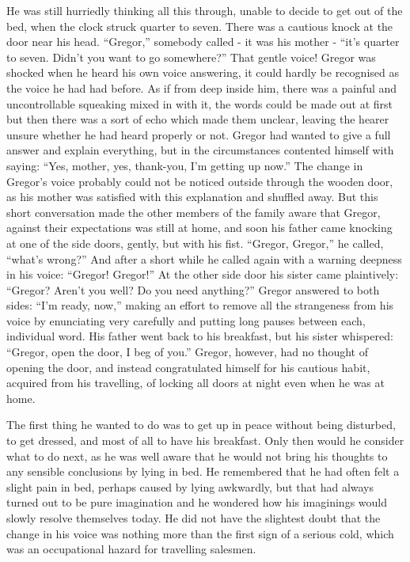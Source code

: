 \documentclass[12pt]{report}
\begin{document}
He was still hurriedly thinking all this through, unable to decide to
get out of the bed, when the clock struck quarter to seven. There was a
cautious knock at the door near his head. ``Gregor,'' somebody called -
it was his mother - ``it's quarter to seven. Didn't you want to go
somewhere?'' That gentle voice! Gregor was shocked when he heard his own
voice answering, it could hardly be recognised as the voice he had had
before. As if from deep inside him, there was a painful and
uncontrollable squeaking mixed in with it, the words could be made out
at first but then there was a sort of echo which made them unclear,
leaving the hearer unsure whether he had heard properly or not. Gregor
had wanted to give a full answer and explain everything, but in the
circumstances contented himself with saying: ``Yes, mother, yes,
thank-you, I'm getting up now.'' The change in Gregor's voice probably
could not be noticed outside through the wooden door, as his mother was
satisfied with this explanation and shuffled away. But this short
conversation made the other members of the family aware that Gregor,
against their expectations was still at home, and soon his father came
knocking at one of the side doors, gently, but with his fist. ``Gregor,
Gregor,'' he called, ``what's wrong?'' And after a short while he called
again with a warning deepness in his voice: ``Gregor! Gregor!'' At the
other side door his sister came plaintively: ``Gregor? Aren't you well?
Do you need anything?'' Gregor answered to both sides: ``I'm ready,
now,'' making an effort to remove all the strangeness from his voice by
enunciating very carefully and putting long pauses between each,
individual word. His father went back to his breakfast, but his sister
whispered: ``Gregor, open the door, I beg of you.'' Gregor, however, had
no thought of opening the door, and instead congratulated himself for
his cautious habit, acquired from his travelling, of locking all doors
at night even when he was at home.

The first thing he wanted to do was to get up in peace without being
disturbed, to get dressed, and most of all to have his breakfast. Only
then would he consider what to do next, as he was well aware that he
would not bring his thoughts to any sensible conclusions by lying in
bed. He remembered that he had often felt a slight pain in bed, perhaps
caused by lying awkwardly, but that had always turned out to be pure
imagination and he wondered how his imaginings would slowly resolve
themselves today. He did not have the slightest doubt that the change in
his voice was nothing more than the first sign of a serious cold, which
was an occupational hazard for travelling salesmen.
\end{document}
